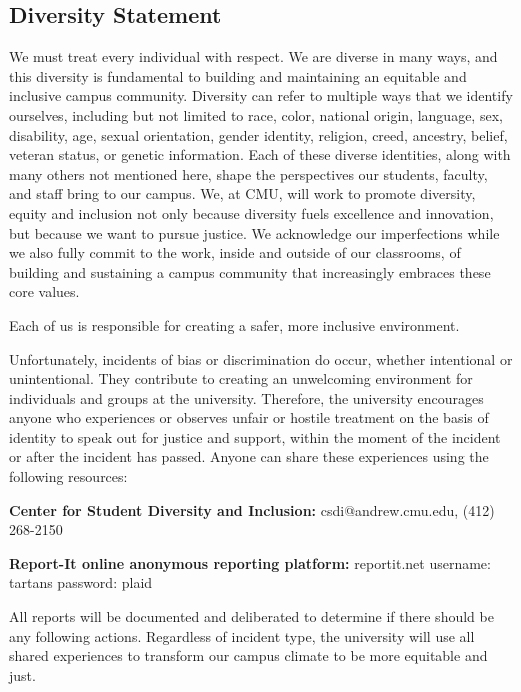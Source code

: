 \subsection{Diversity Statement}

We must treat every individual with respect. 
We are diverse in many ways, 
and this diversity is fundamental to building and maintaining an equitable and inclusive campus community. 
Diversity can refer to multiple ways that we identify ourselves, 
including but not limited to 
race, color, national origin, language, sex, disability, age, sexual orientation, 
gender identity, religion, creed, ancestry, belief, veteran status, or genetic information. 
Each of these diverse identities, 
along with many others not mentioned here, shape the perspectives our students, faculty, and staff bring to our campus.
We, at CMU, will work to promote diversity, equity and inclusion 
not only because diversity fuels excellence and innovation, 
but because we want to pursue justice. 
We acknowledge our imperfections while we also fully commit to the work, 
inside and outside of our classrooms, 
of building and sustaining a campus community that increasingly embraces these core values.

Each of us is responsible for creating a safer, more inclusive environment.

Unfortunately, incidents of bias or discrimination do occur, whether intentional or unintentional. 
They contribute to creating an unwelcoming environment for individuals and groups at the university. 
Therefore, the university encourages anyone who experiences or observes unfair or hostile treatment 
on the basis of identity to speak out for justice and support, 
within the moment of the incident or after the incident has passed. 
Anyone can share these experiences using the following resources:

\textbf{Center for Student Diversity and Inclusion:} csdi@andrew.cmu.edu, (412) 268-2150

\textbf{Report-It online anonymous reporting platform:} reportit.net username: tartans password: plaid

All reports will be documented and deliberated to determine if there should be any following actions. 
Regardless of incident type, the university will use all shared experiences to transform our campus climate to be more equitable and just.



